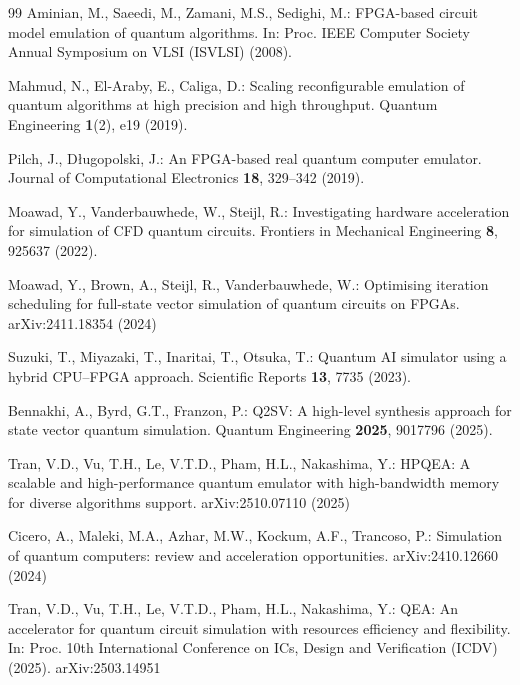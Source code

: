 \begin{thebibliography}{99}
Aminian, M., Saeedi, M., Zamani, M.S., Sedighi, M.: FPGA-based circuit model emulation of quantum algorithms. In: Proc. IEEE Computer Society Annual Symposium on VLSI (ISVLSI) (2008). 

Mahmud, N., El-Araby, E., Caliga, D.: Scaling reconfigurable emulation of quantum algorithms at high precision and high throughput. Quantum Engineering \textbf{1}(2), e19 (2019). 

Pilch, J., D{\l}ugopolski, J.: An FPGA-based real quantum computer emulator. Journal of Computational Electronics \textbf{18}, 329--342 (2019). 

Moawad, Y., Vanderbauwhede, W., Steijl, R.: Investigating hardware acceleration for simulation of CFD quantum circuits. Frontiers in Mechanical Engineering \textbf{8}, 925637 (2022). 

Moawad, Y., Brown, A., Steijl, R., Vanderbauwhede, W.: Optimising iteration scheduling for full-state vector simulation of quantum circuits on FPGAs. arXiv:2411.18354 (2024)

Suzuki, T., Miyazaki, T., Inaritai, T., Otsuka, T.: Quantum AI simulator using a hybrid CPU--FPGA approach. Scientific Reports \textbf{13}, 7735 (2023). 

Bennakhi, A., Byrd, G.T., Franzon, P.: Q2SV: A high-level synthesis approach for state vector quantum simulation. Quantum Engineering \textbf{2025}, 9017796 (2025). 

Tran, V.D., Vu, T.H., Le, V.T.D., Pham, H.L., Nakashima, Y.: HPQEA: A scalable and high-performance quantum emulator with high-bandwidth memory for diverse algorithms support. arXiv:2510.07110 (2025)

Cicero, A., Maleki, M.A., Azhar, M.W., Kockum, A.F., Trancoso, P.: Simulation of quantum computers: review and acceleration opportunities. arXiv:2410.12660 (2024)

Tran, V.D., Vu, T.H., Le, V.T.D., Pham, H.L., Nakashima, Y.: QEA: An accelerator for quantum circuit simulation with resources efficiency and flexibility. In: Proc. 10th International Conference on ICs, Design and Verification (ICDV) (2025). arXiv:2503.14951


\end{thebibliography}
